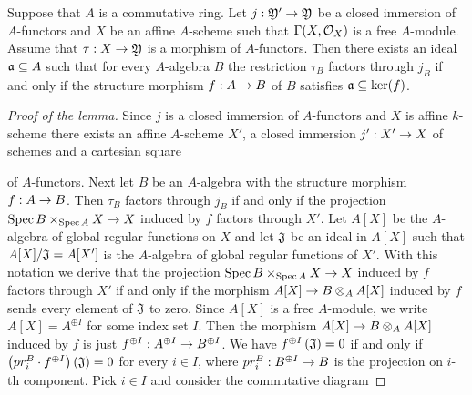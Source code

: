 \begin{lemma}\label{lemma:for_affine_local_factorization}
Suppose that $A$ is a commutative ring. Let $j:{\mathfrak Y}'\rightarrow {\mathfrak Y}$ be a closed immersion of $A$-functors and $X$ be an affine $A$-scheme such that $\Gamma(X,{\mathcal O}_X)$ is a free $A$-module. Assume that $\tau:X\rightarrow {\mathfrak Y}$ is a morphism of $A$-functors. Then there exists an ideal $\mathfrak{a}\subseteq A$ such that for every $A$-algebra $B$ the restriction $\tau_B$ factors through $j_B$ if and only if the structure morphism $f:A\rightarrow B$ of $B$ satisfies $\mathfrak{a}\subseteq \ker(f)$.
\end{lemma}
\begin{proof}[Proof of the lemma]
Since $j$ is a closed immersion of $A$-functors and $X$ is affine $k$-scheme there exists an affine $A$-scheme $X'$, a closed immersion $j':X'\rightarrow X$ of schemes and a cartesian square
\begin{center}
\end{center}
of $A$-functors. Next let $B$ be an $A$-algebra with the structure morphism $f:A\rightarrow B$. Then $\tau_B$ factors through $j_B$ if and only if the projection $\mathrm{Spec}\, B\times_{\mathrm{Spec}\, A}X\rightarrow X$ induced by $f$ factors through $X'$. Let $A[X]$ be the $A$-algebra of global regular functions on $X$ and let $\mathfrak{J}$ be an ideal in $A[X]$ such that $A[X]/\mathfrak{J} = A[X']$ is the $A$-algebra of global regular functions of $X'$. With this notation we derive that the projection $\mathrm{Spec}\, B\times_{\mathrm{Spec}\, A}X\rightarrow X$ induced by $f$ factors through $X'$ if and only if the morphism $A[X]\rightarrow B\otimes_AA[X]$ induced by $f$ sends every element of $\mathfrak{J}$ to zero. Since $A[X]$ is a free $A$-module, we write $A[X] = A^{\oplus I}$ for some index set $I$. Then the morphism $A[X]\rightarrow B\otimes_AA[X]$ induced by $f$ is just $f^{\oplus I}:A^{\oplus I}\rightarrow B^{\oplus I}$. We have $f^{\oplus I}\left(\mathfrak{J}\right)=0$ if and only if $\left(pr^B_i\cdot f^{\oplus I}\right)\left(\mathfrak{J}\right)=0$ for every $i\in I$, where $pr^B_i:B^{\oplus I}\rightarrow B$ is the projection on $i$-th component. Pick $i\in I$ and consider the commutative diagram

\end{proof}
